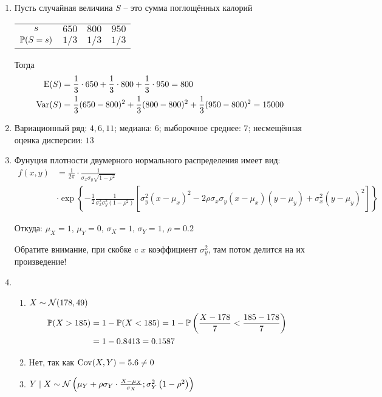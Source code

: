 \begin{enumerate}
\item Пусть случайная величина $S$ – это сумма поглощённых калорий

\begin{center}
\begin{tabular}{cccc}
\toprule
$s$ & $650$ & $800$ & $950$ \\
$\P(S = s)$ & $1/3$ & $1/3$ & $1/3$ \\ \bottomrule
\end{tabular}
\end{center}

Тогда
\begin{align*}
\E(S) &= \frac{1}{3}\cdot 650 +  \frac{1}{3}\cdot 800 +  \frac{1}{3}\cdot 950 = 800 \\
\Var(S) &= \frac{1}{3}(650-800)^2 + \frac{1}{3}(800-800)^2 + \frac{1}{3}(950-800)^2 = 15000
\end{align*}
\item Вариационный ряд: $4, 6, 11$; медиана: $6$; выборочное среднее: $7$;
несмещённая оценка дисперсии: $13$
\item Фунуция плотности двумерного нормального распределения имеет вид:
\begin{align*}
f(x,y) &= \frac{1}{2\pi}\cdot \frac{1}{\sigma_x \sigma_y \sqrt{1-\rho^2}} \\
&\cdot
\exp\left\{{-\frac{1}{2}\frac{1}{\sigma_x^2 \sigma_y^2\left(1-\rho^2\right)}\left[\sigma_y^2(x-\mu_x)^2-2\rho\sigma_x\sigma_y(x-\mu_x)(y-\mu_y)+\sigma_x^2(y-\mu_y)^2\right]}\right\}
\end{align*}

Откуда: $\mu_X=1$, $\mu_Y=0$, $\sigma_X = 1$, $\sigma_Y = 1$, $\rho = 0.2$

Обратите внимание, при скобке c $x$ коэффициент $\sigma^2_y$, там потом делится на их произведение!

\item
\begin{enumerate}
\item $X \sim \cN(178, 49)$
\begin{align*}
\P(X>185) &= 1  - \P(X<185) = 1- \P\left(\frac{X-178}{7} < \frac{185-178}{7}\right) \\
&= 1 - 0.8413 = 0.1587
\end{align*}
\item Нет, так как $\Cov(X, Y) = 5.6 \neq 0$
\item $Y \mid X \sim \cN\left(\mu_Y + \rho\sigma_Y\cdot\frac{X-\mu_X}{\sigma_X}; \sigma_Y^2\left(1-\rho^2\right)\right)$


\end{enumerate}
\end{enumerate}
